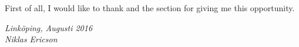 \begin{acknowledgments}
  First of all, I would like to thank \abbrCERN and the \abbrENSTIECE section for giving me this opportunity. 

  \addvspace{1em}
  \begin{flushright}
    \textit{%
      Linköping, Augusti 2016\\
      Niklas Ericson%
    }
  \end{flushright}
\end{acknowledgments}

